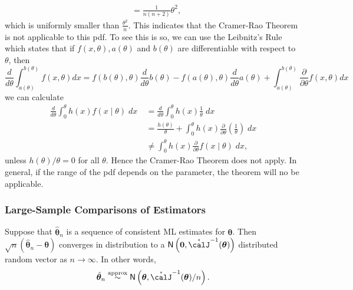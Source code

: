 \begin{exam}
\begin{align*}
         & = \frac{1}{n(n+2)} \theta^2,
    \end{align*}
    which is uniformly smaller than $\frac{\theta^2}{n}$. This indicates that the Cramer-Rao Theorem is not applicable to this pdf. To see this is so, we can use the Leibnitz's Rule which states that if $f(x , \theta), a(\theta)$ and $b(\theta)$ are differentiable with respect to $\theta$, then
    \begin{equation*}
        \frac{d}{d \theta} \int_{a(\theta)}^{b(\theta)} f(x, \theta) d x=f(b(\theta), \theta) \frac{d}{d \theta} b(\theta)-f(a(\theta), \theta) \frac{d}{d \theta} a(\theta)+\int_{a(\theta)}^{b(\theta)} \frac{\partial}{\partial \theta} f(x, \theta) d x
    \end{equation*}
    we can calculate
    \begin{align*}
        \frac{d}{d \theta} \int_{0}^{\theta} h(x) f(x \mid \theta) \; d x \
         & =\frac{d}{d \theta} \int_{0}^{\theta} h(x) \frac{1}{\theta} \; d x                                                     \\
         & = \frac{h(\theta)}{\theta}+\int_{0}^{\theta} h(x) \frac{\partial}{\partial \theta}\left(\frac{1}{\theta}\right) \; d x \\
         & \neq \int_{0}^{\theta} h(x) \frac{\partial}{\partial \theta} f(x \mid \theta) \; d x,
    \end{align*}
    unless $h(\theta) / \theta = 0$ for all $\theta$. Hence the Cramer-Rao Theorem does not apply. In general, if the range of the pdf depends on the parameter, the theorem will no be applicable.
\end{exam}

\subsubsection*{Large-Sample Comparisons of Estimators}

\begin{thm} \label{thm: large_samp_est}
    Suppose that $\hat{\bm{\theta}}_n$ is a sequence of consistent ML estimates for $\bm{\theta}$. Then $\sqrt{n} \left( \hat{\bm{\theta}}_n - \bm{\theta} \right)$ converges in distribution to a $\Nor \left( \bm{0} , \mathring{\calJ}^{-1} (\bm{\theta}) \right)$ distributed random vector as $n \to \infty$. In other words,
    \begin{align*}
        \hat{\bm{\theta}}_n \overset{\text{approx}}{\sim} \Nor \left( \bm{\theta} , \mathring{\calJ}^{-1} (\bm{\theta}) / n \right) .
    \end{align*}
\end{thm}

